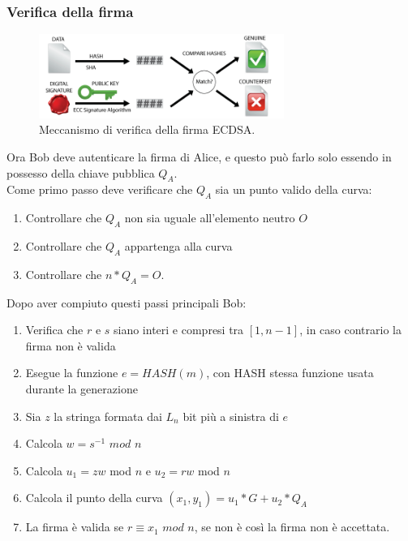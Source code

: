 \documentclass[a4paper,11pt]{report}
\begin{document}
\subsubsection{Verifica della firma}
\begin{figure}[htbp] 
\begin{center}
\includegraphics[width=8cm]{img/E.png} 
\end{center}
\caption{Meccanismo di verifica della firma ECDSA. \cite{SHA}}
\end{figure}
Ora Bob deve autenticare la firma di Alice, e questo può farlo solo essendo in possesso della chiave pubblica $Q_{A}$.\\
Come primo passo deve verificare che $Q_{A}$ sia un punto valido della curva:
\begin{enumerate}
\item Controllare che $Q_{A}$ non sia uguale all'elemento neutro $O$
\item Controllare che $Q_{A}$ appartenga alla curva
\item Controllare che $n*Q_{A}=O$.
\end{enumerate}
Dopo aver compiuto questi passi principali Bob:
\begin{enumerate}
\item Verifica che $r$ e $s$ siano interi e compresi tra $[1,n-1]$, in caso contrario la firma non è valida
\item Esegue la funzione $e=HASH(m)$, con HASH stessa funzione usata durante la generazione
\item Sia $z$ la stringa formata dai $L_{n}$ bit più a sinistra di $e$
\item Calcola $w=s^{-1}$ $mod$ $n$
\item Calcola $u_{1} = zw$ mod $n$ e $u_{2} = rw$ mod $n$
\item Calcola il punto della curva $(x_{1},y_{1}) = u_{1}*G+u_{2}*Q_{A}$
\item La firma è valida se $r\equiv x_{1}$ $mod$ $n$, se non è così la firma non è accettata.
\end{enumerate}
\end{document}
